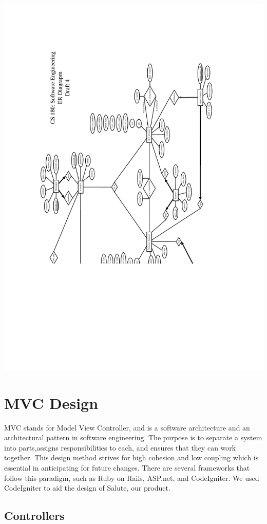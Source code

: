 \documentclass[12pt]{report}
\begin{document}
\includegraphics[scale=0.6,angle=180]{cs180_ER_draft4.pdf}

\section{MVC Design}

MVC stands for Model View Controller, and is a software architecture and an architectural pattern in software engineering. The purpose is to separate a system into parts,assigns responsibilities to each, and ensures that they can work together. This design method strives for high cohesion and low coupling which is essential in anticipating for future changes. There are several frameworks that follow this paradigm, such as Ruby on Rails, ASP.net, and CodeIgniter. We used CodeIgniter to aid the design of Salute, our product.  

\subsection{Controllers}
\end{document}
